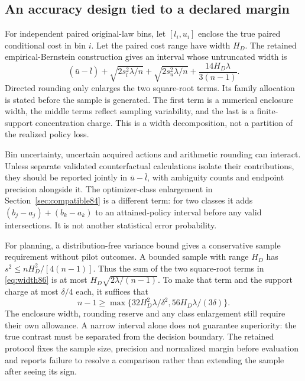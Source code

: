 \subsection{An accuracy design tied to a declared margin}
For independent paired original-law bins, let $[l_i,u_i]$ enclose the true paired conditional cost in bin $i$. Let the paired cost range have width $H_D$. The retained empirical-Bernstein construction gives an interval whose untruncated width is
\begin{equation}\label{eq:width86}
 (\bar u-\bar l)+\sqrt{2s_l^2\lambda/n}
 +\sqrt{2s_u^2\lambda/n}
 +\frac{14H_D\lambda}{3(n-1)}.
\end{equation}
Directed rounding only enlarges the two square-root terms. Its family allocation is stated before the sample is generated. The first term is a numerical enclosure width, the middle terms reflect sampling variability, and the last is a finite-support concentration charge. This is a width decomposition, not a partition of the realized policy loss.

Bin uncertainty, uncertain acquired actions and arithmetic rounding can interact. Unless separate validated counterfactual calculations isolate their contributions, they should be reported jointly in $\bar u-\bar l$, with ambiguity counts and endpoint precision alongside it. The optimizer-class enlargement in Section~\ref{sec:compatible84} is a different term: for two classes it adds $(b_j-a_j)+(b_k-a_k)$ to an attained-policy interval before any valid intersections. It is not another statistical error probability.

For planning, a distribution-free variance bound gives a conservative sample requirement without pilot outcomes. A bounded sample with range $H_D$ has $s^2\le nH_D^2/[4(n-1)]$. Thus the sum of the two square-root terms in \eqref{eq:width86} is at most $H_D\sqrt{2\lambda/(n-1)}$. To make that term and the support charge at most $\delta/4$ each, it suffices that
\[
 n-1\ge\max\{32H_D^2\lambda/\delta^2,
                  56H_D\lambda/(3\delta)\}.
\]
The enclosure width, rounding reserve and any class enlargement still require their own allowance. A narrow interval alone does not guarantee superiority: the true contrast must be separated from the decision boundary. The retained protocol fixes the sample size, precision and normalized margin before evaluation and reports failure to resolve a comparison rather than extending the sample after seeing its sign.
